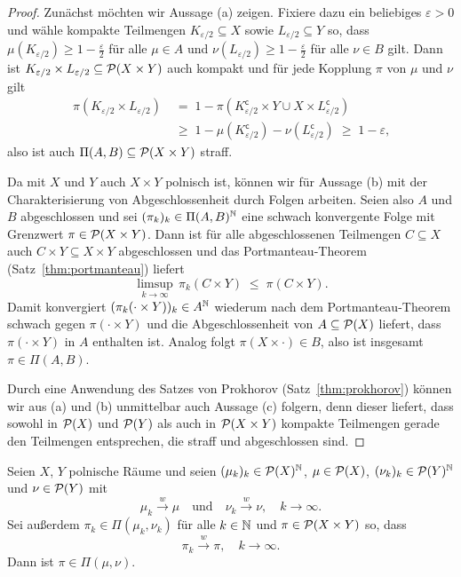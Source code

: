 \documentclass[../main/main.tex]{subfiles}
\begin{document}
	\begin{proof}
		Zunächst möchten wir Aussage (a) zeigen. Fixiere dazu ein beliebiges $\varepsilon > 0 $ und wähle kompakte Teilmengen $K_{\varepsilon/2} \subseteq X$ sowie $L_{\varepsilon/2} \subseteq Y$ so, dass $\mu(K_{\varepsilon/2}) \geq 1 - \frac{\varepsilon}{2}$ 
		für alle $\mu \in A$ und $\nu(L_{\varepsilon/2}) \geq 1 - \frac{\varepsilon}{2}$ für alle $\nu \in B$ gilt. Dann ist $K_{\varepsilon/2} \times L_{\varepsilon/2} \subseteq \mathcal{P}(X \times Y)$ auch kompakt und für jede Kopplung $\pi$ von $\mu$ und $\nu$ gilt
		\begin{align*}
			\pi(K_{\varepsilon/2} \times L_{\varepsilon/2}) \; &= \; 1 - \pi(K_{\varepsilon/2}^\mathsf{c} \times Y \cup X \times L_{\varepsilon/2}^\mathsf{c}) \\
			&\geq \; 1 - \mu(K_{\varepsilon/2}^\mathsf{c}) - \nu(L_{\varepsilon/2}^\mathsf{c}) \; \geq \; 1 - \varepsilon \text{,}
		\end{align*}
		also ist auch $\Pi(A, B) \subseteq \mathcal{P}(X \times Y)$ straff.
		
		Da mit $X$ und $Y$ auch $X \times Y$ polnisch ist, können wir für Aussage (b) mit der Charakterisierung von Abgeschlossenheit durch Folgen arbeiten.
		Seien also $A$ und $B$ abgeschlossen und sei $(\pi_k)_k \in \Pi(A, B)^{\mathbb{N}}$ eine schwach konvergente Folge mit Grenzwert $\pi \in \mathcal{P}(X \times Y)$.
		Dann ist für alle abgeschlossenen Teilmengen $C \subseteq X$ auch $C \times Y \subseteq X \times Y$ abgeschlossen und das Portmanteau-Theorem (Satz~\ref{thm:portmanteau}) liefert
		\[ \limsup_{k \to \infty} \, \pi_k(C \times Y) \; \leq \; \pi(C \times Y) \text{.} \]
		Damit konvergiert $(\pi_k(\cdot \times Y))_k \in A^{\mathbb{N}}$ wiederum nach dem Portmanteau-Theorem schwach gegen $\pi(\cdot \times Y)$ und die Abgeschlossenheit 
		von $A \subseteq \mathcal{P}(X)$ liefert, dass $\pi(\cdot \times Y)$ in $A$
		enthalten ist. Analog folgt $\pi(X \times \cdot) \in B$, also ist insgesamt $\pi \in \Pi(A, B)$.
		
		Durch eine Anwendung des Satzes von Prokhorov (Satz~\ref{thm:prokhorov}) können wir aus (a) und (b) unmittelbar auch Aussage (c) folgern, denn dieser liefert, dass sowohl in $\mathcal{P}(X)$ und $\mathcal{P}(Y)$ als auch in $\mathcal{P}(X \times Y)$ kompakte Teilmengen gerade den Teilmengen entsprechen, die straff und abgeschlossen sind.
	\end{proof}

	\begin{Hilfssatz}
		\label{lem:convimpliescouplingsconv}
		Seien $X$, $Y$ polnische Räume und seien $(\mu_k)_k \in \mathcal{P}(X)^{\mathbb{N}}$, $\mu \in \mathcal{P}(X)$, $(\nu_k)_k \in \mathcal{P}(Y)^{\mathbb{N}}$ und $\nu \in \mathcal{P}(Y)$ mit
		\[ \mu_k \xrightarrow{w} \mu \quad \text{und} \quad \nu_k \xrightarrow{w} \nu, \quad k \to \infty \text{.} \]
		Sei außerdem $\pi_k \in \Pi(\mu_k, \nu_k)$ für alle $k \in \mathbb{N}$ und $\pi \in \mathcal{P}(X \times Y)$ so, dass
		\[ \pi_k \xrightarrow{w} \pi, \quad k \to \infty \text{.} \]
		Dann ist $\pi \in \Pi(\mu, \nu)$.
	\end{Hilfssatz}
\end{document}
